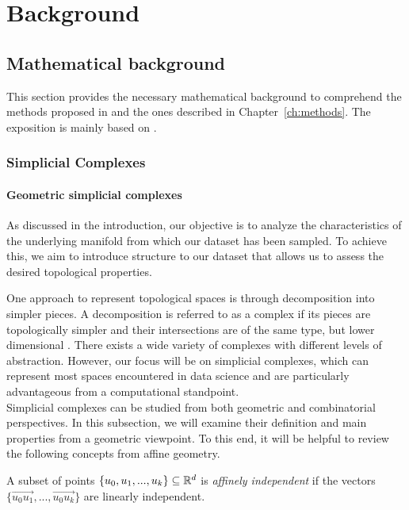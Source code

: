 \documentclass[../main.tex]{subfiles}
\begin{document}
\chapter{Background}
\label{ch:background}

\section{Mathematical background}
\label{sec:tda}
This section provides the necessary mathematical background to comprehend the methods proposed in \cite{hofer_densified_2021, moschella_relative_2022} and the ones described in Chapter~\ref{ch:methods}. The exposition is mainly based on \cite{edelsbrunner_computational_2010}.

\subsection{Simplicial Complexes}
\subsubsection*{Geometric simplicial complexes}

As discussed in the introduction, our objective is to analyze the characteristics of the underlying manifold from which our dataset has been sampled. To achieve this, we aim to introduce structure to our dataset that allows us to assess the desired topological properties.

One approach to represent topological spaces is through decomposition into simpler pieces. A decomposition is referred to as a complex if its pieces are topologically simpler and their intersections are of the same type, but lower dimensional \cite{edelsbrunner_computational_2010}. There exists a wide variety of complexes with different levels of abstraction. However, our focus will be on simplicial complexes, which can represent most spaces encountered in data science and are particularly advantageous from a computational standpoint.\\

Simplicial complexes can be studied from both geometric and combinatorial perspectives. In this subsection, we will examine their definition and main properties from a geometric viewpoint. To this end, it will be helpful to review the following concepts from affine geometry.

\begin{definition}
A subset of points $\{u_0, u_1, ..., u_k\} \subseteq \mathbb{R}^d$ is \emph{affinely independent} if the vectors $\{\overrightarrow{u_0u_1}, ..., \overrightarrow{u_0u_k}\}$ are linearly independent.
\end{definition}
\end{document}
